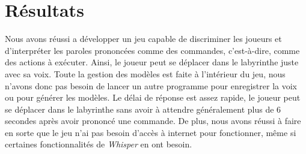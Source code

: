 \section{Résultats}
\label{sec:resultats}

Nous avons réussi a développer un jeu capable de discriminer les joueurs et d'interpréter les paroles prononcées comme des commandes, c'est-à-dire, comme des
actions à exécuter. Ainsi, le joueur peut se déplacer dans le labyrinthe juste avec sa voix. Toute la gestion des modèles est faite à l'intérieur du jeu, nous
n'avons donc pas besoin de lancer un autre programme pour enregistrer la voix ou pour générer les modèles. Le délai de réponse est assez rapide, le joueur
peut se déplacer dans le labyrinthe sans avoir à attendre généralement plus de 6 secondes après avoir prononcé une commande. De plus, nous avons réussi à faire
en sorte que le jeu n'ai pas besoin d'accès à internet pour fonctionner, même si certaines fonctionnalités de \textit{Whisper} en ont besoin.

